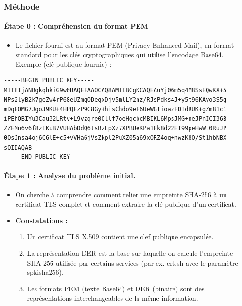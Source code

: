 \subsubsection{Méthode}
\paragraph{Étape 0 : Compréhension du format PEM}
\begin{itemize}
    \item Le fichier fourni est au format PEM (Privacy-Enhanced Mail), un
            format standard pour les clés cryptographiques qui utilise
            l'encodage Base64. Exemple (clé publique fournie) :
\end{itemize}

\begin{verbatim}
-----BEGIN PUBLIC KEY-----
MIIBIjANBgkqhkiG9w0BAQEFAAOCAQ8AMIIBCgKCAQEAuYj06m5q4M8SsEQwKX+5
NPs2lyB2k7geZw4rP68eUZmqODeqxDjv5mlLY2nz/RJsPdks4J+y5t96KAyo3S5g
mDqEOMG7JgoJ9KU+4HPQFzP9C8Gy+hisChdo9eF6UeWGTioazFDIdRUK+gZm81c1
iPEhOBIYu3Cau32LRtv+L9vzqre0Ollf7oeHqcbcMBIKL6MpsJMG+neJPnICI36B
ZZEMu6v6f8zIKuB7VUHAbDdQ6tsBzLpXz7XPBUeKPa1Fk8d22EI99peHwWt0RuJP
0QsJnsa4oj6C6lE+c5+vVHa6jVsZkpl2PuXZ05a69xORZ4oq+nwzK8O/St1hbNBX
sQIDAQAB
-----END PUBLIC KEY-----
\end{verbatim}

\paragraph{\textbf{Étape 1 : Analyse du problème initial.}}
\begin{itemize}
    \item On cherche à comprendre comment relier une empreinte SHA-256 à un
            certificat TLS complet et comment extraire la clé publique d'un
            certificat.
    \item \textbf{Constatations :}
    \begin{enumerate}
        \item Un certificat TLS X.509 contient une clef publique encapsulée.
        \item La représentation DER est la base sur laquelle on calcule
                l'empreinte SHA-256 utilisée par certains services (par ex.
                crt.sh avec le paramètre spkisha256).
        \item Les formats PEM (texte Base64) et DER (binaire) sont des
                représentations interchangeables de la même information.
    \end{enumerate}
\end{itemize}

